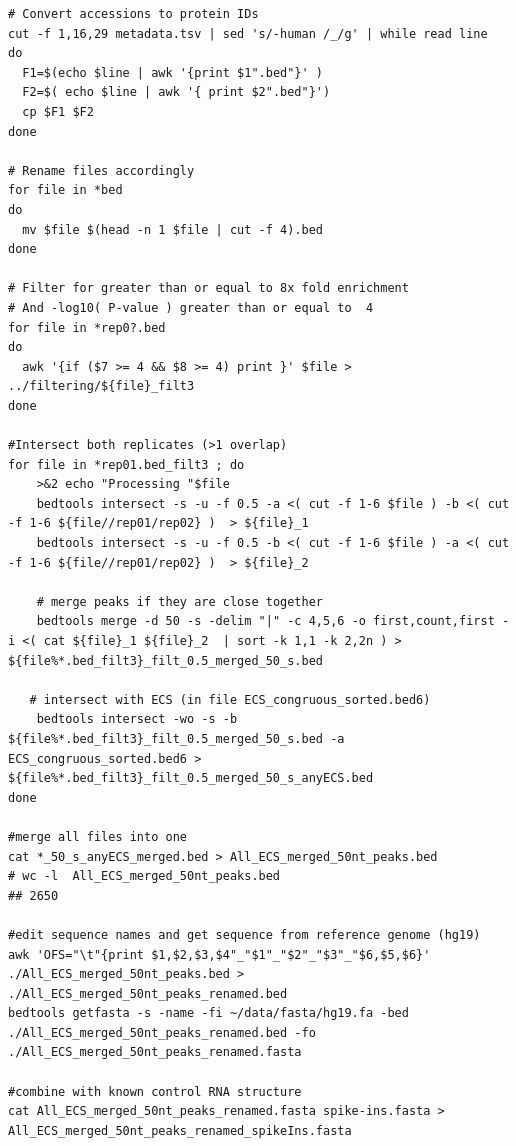 \documentclass[a4paper,11pt]{article}
\begin{document}
\begin{lstlisting}
# Convert accessions to protein IDs
cut -f 1,16,29 metadata.tsv | sed 's/-human /_/g' | while read line 
do 
  F1=$(echo $line | awk '{print $1".bed"}' ) 
  F2=$( echo $line | awk '{ print $2".bed"}') 
  cp $F1 $F2 
done 

# Rename files accordingly
for file in *bed
do 
  mv $file $(head -n 1 $file | cut -f 4).bed
done

# Filter for greater than or equal to 8x fold enrichment
# And -log10( P-value ) greater than or equal to  4
for file in *rep0?.bed 
do
  awk '{if ($7 >= 4 && $8 >= 4) print }' $file > ../filtering/${file}_filt3
done

#Intersect both replicates (>1 overlap) 
for file in *rep01.bed_filt3 ; do     
    >&2 echo "Processing "$file
    bedtools intersect -s -u -f 0.5 -a <( cut -f 1-6 $file ) -b <( cut -f 1-6 ${file//rep01/rep02} )  > ${file}_1
    bedtools intersect -s -u -f 0.5 -b <( cut -f 1-6 $file ) -a <( cut -f 1-6 ${file//rep01/rep02} )  > ${file}_2
    
    # merge peaks if they are close together
    bedtools merge -d 50 -s -delim "|" -c 4,5,6 -o first,count,first -i <( cat ${file}_1 ${file}_2  | sort -k 1,1 -k 2,2n ) > ${file%*.bed_filt3}_filt_0.5_merged_50_s.bed
    
   # intersect with ECS (in file ECS_congruous_sorted.bed6) 
    bedtools intersect -wo -s -b ${file%*.bed_filt3}_filt_0.5_merged_50_s.bed -a ECS_congruous_sorted.bed6 > ${file%*.bed_filt3}_filt_0.5_merged_50_s_anyECS.bed
done

#merge all files into one
cat *_50_s_anyECS_merged.bed > All_ECS_merged_50nt_peaks.bed
# wc -l  All_ECS_merged_50nt_peaks.bed
## 2650

#edit sequence names and get sequence from reference genome (hg19) 
awk 'OFS="\t"{print $1,$2,$3,$4"_"$1"_"$2"_"$3"_"$6,$5,$6}'  ./All_ECS_merged_50nt_peaks.bed > ./All_ECS_merged_50nt_peaks_renamed.bed
bedtools getfasta -s -name -fi ~/data/fasta/hg19.fa -bed ./All_ECS_merged_50nt_peaks_renamed.bed -fo ./All_ECS_merged_50nt_peaks_renamed.fasta

#combine with known control RNA structure
cat All_ECS_merged_50nt_peaks_renamed.fasta spike-ins.fasta > All_ECS_merged_50nt_peaks_renamed_spikeIns.fasta
\end{lstlisting}
\end{document}

